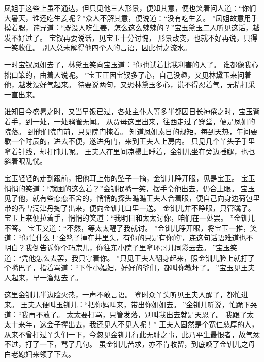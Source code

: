 凤姐于这些上虽不通达，但只见他三人形景，便知其意，便也笑着问人道：“你们大暑天，谁还吃生姜呢？”众人不解其意，便说道：“没有吃生姜。
”凤姐故意用手摸着腮，诧异道：“既没人吃生姜，怎么这么辣辣的？”宝玉黛玉二人听见这话，越发不好过了。
宝钗再要说话，见宝玉十分讨愧，
形景改变，也就不好再说，只得一笑收住。
别人总未解得他四个人的言语，因此付之流水。
\par
一时宝钗凤姐去了，林黛玉笑向宝玉道：“你也试着比我利害的人了。
谁都像我心拙口笨的，由着人说呢。
”宝玉正因宝钗多了心，自己没趣，又见林黛玉来问着他，越发没好气起来。
待要说两句，又恐林黛玉多心，说不得忍着气，无精打采一直出来。
\par
谁知目今盛暑之时，又当早饭已过，各处主仆人等多半都因日长神倦之时，宝玉背着手，到一处，一处鸦雀无闻。
从贾母这里出来，往西走过了穿堂，便是凤姐的院落。
到他们院门前，只见院门掩着。
知道凤姐素日的规矩，每到天热，午间要歇一个时辰的，进去不便，遂进角门，来到王夫人上房内。
只见几个丫头子手里拿着针线，却打盹儿呢。
王夫人在里间凉榻上睡着，金钏儿坐在旁边捶腿，也乜斜着眼乱恍。
\par
宝玉轻轻的走到跟前，把他耳上带的坠子一摘，金钏儿睁开眼，见是宝玉。
宝玉悄悄的笑道：“就困的这么着？”金钏抿嘴一笑，摆手令他出去，仍合上眼。
宝玉见了他，就有些恋恋不舍的，悄悄的探头瞧瞧王夫人合着眼，便自己向身边荷包里带的香雪润津丹掏了出来，便向金钏儿口里一送。
金钏儿并不睁眼，只管噙了。
宝玉上来便拉着手，悄悄的笑道：“我明日和太太讨你，咱们在一处罢。
”金钏儿不答。
宝玉又道：“不然，等太太醒了我就讨。
”金钏儿睁开眼，将宝玉一推，笑道：“你忙什么！‘金簪子掉在井里头，有你的只是有你的’，连这句话语难道也不明白？我倒告诉你个巧宗儿，你往东小院子里拿环哥儿同彩云去。
”宝玉笑道：“凭他怎么去罢，我只守着你。
”只见王夫人翻身起来，照金钏儿脸上就打了个嘴巴子，指着骂道：“下作小娼妇，好好的爷们，都叫你教坏了。
”宝玉见王夫人起来，早一溜烟去了。
\par
这里金钏儿半边脸火热，一声不敢言语。
登时众丫头听见王夫人醒了，都忙进来。
王夫人便叫玉钏儿：“把你妈叫来，带出你姐姐去。
”金钏儿听说，忙跪下哭道：“我再不敢了。
太太要打骂，只管发落，别叫我出去就是天恩了。
我跟了太太十来年，这会子撵出去，我还见人不见人呢！”
王夫人固然是个宽仁慈厚的人，从来不曾打过丫头们一下，今忽见金钏儿行此无耻之事，此乃平生最恨者，故气忿不过，打了一下，骂了几句。
虽金钏儿苦求，亦不肯收留，到底唤了金钏儿之母白老媳妇来领了下去。
